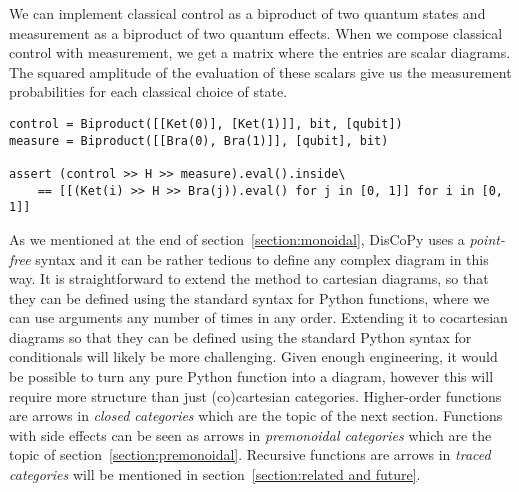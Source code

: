 \begin{example}
We can implement classical control as a biproduct of two quantum states and measurement as a biproduct of two quantum effects.
When we compose classical control with measurement, we get a matrix where the entries are scalar diagrams.
The squared amplitude of the evaluation of these scalars give us the measurement probabilities for each classical choice of state.

\begin{verbatim}
control = Biproduct([[Ket(0)], [Ket(1)]], bit, [qubit])
measure = Biproduct([[Bra(0), Bra(1)]], [qubit], bit)

assert (control >> H >> measure).eval().inside\
    == [[(Ket(i) >> H >> Bra(j)).eval() for j in [0, 1]] for i in [0, 1]]
\end{verbatim}
\end{example}

As we mentioned at the end of section~\ref{section:monoidal}, DisCoPy uses a \emph{point-free} syntax and it can be rather tedious to define any complex diagram in this way.
It is straightforward to extend the \py{diagramize} method to cartesian diagrams, so that they can be defined using the standard syntax for Python functions, where we can use arguments any number of times in any order.
Extending it to cocartesian diagrams so that they can be defined using the standard Python syntax for conditionals will likely be more challenging.
Given enough engineering, it would be possible to turn any pure Python function into a diagram, however this will require more structure than just (co)cartesian categories.
Higher-order functions are arrows in \emph{closed categories} which are the topic of the next section.
Functions with side effects can be seen as arrows in \emph{premonoidal categories} which are the topic of section~\ref{section:premonoidal}.
Recursive functions are arrows in \emph{traced categories} will be mentioned in section~\ref{section:related and future}.
